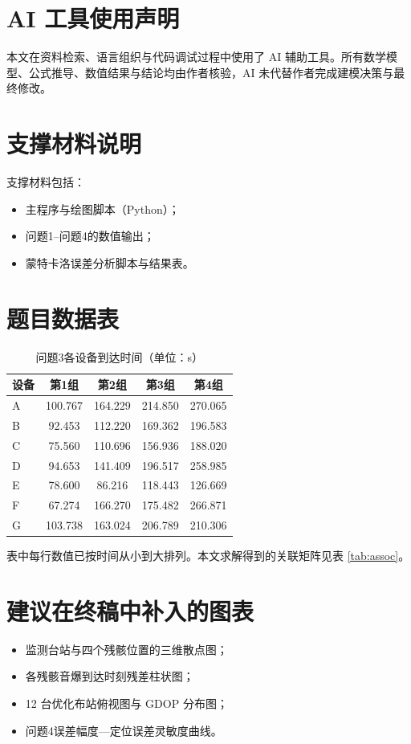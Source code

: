 \documentclass[12pt,a4paper]{article}
\begin{document}
\section*{AI 工具使用声明}
本文在资料检索、语言组织与代码调试过程中使用了 AI 辅助工具。所有数学模型、公式推导、数值结果与结论均由作者核验，AI 未代替作者完成建模决策与最终修改。

\appendix
\section{支撑材料说明}

支撑材料包括：
\begin{itemize}
  \item 主程序与绘图脚本（Python）；
  \item 问题1--问题4的数值输出；
  \item 蒙特卡洛误差分析脚本与结果表。
\end{itemize}

\section{题目数据表}

\begin{table}[H]
\centering
\caption{问题3各设备到达时间（单位：s）}
\label{tab:data3}
\begin{tabular}{lcccc}
\toprule
设备 & 第1组 & 第2组 & 第3组 & 第4组 \\
\midrule
A & 100.767 & 164.229 & 214.850 & 270.065 \\
B & 92.453 & 112.220 & 169.362 & 196.583 \\
C & 75.560 & 110.696 & 156.936 & 188.020 \\
D & 94.653 & 141.409 & 196.517 & 258.985 \\
E & 78.600 & 86.216 & 118.443 & 126.669 \\
F & 67.274 & 166.270 & 175.482 & 266.871 \\
G & 103.738 & 163.024 & 206.789 & 210.306 \\
\bottomrule
\end{tabular}
\end{table}

表中每行数值已按时间从小到大排列。本文求解得到的关联矩阵见表 \ref{tab:assoc}。

\section{建议在终稿中补入的图表}

\begin{itemize}
  \item 监测台站与四个残骸位置的三维散点图；
  \item 各残骸音爆到达时刻残差柱状图；
  \item 12 台优化布站俯视图与 GDOP 分布图；
  \item 问题4误差幅度—定位误差灵敏度曲线。
\end{itemize}
\end{document}
